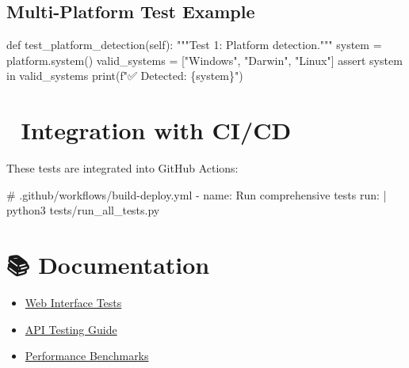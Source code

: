 \documentclass[
  11pt,
  oneside,
  openany]{scrbook}
\newenvironment{Shaded}{\begin{snugshade}}{\end{snugshade}}
\newcommand{\AttributeTok}[1]{\textcolor[rgb]{0.40,0.45,0.13}{#1}}
\newcommand{\BuiltInTok}[1]{\textcolor[rgb]{0.00,0.23,0.31}{#1}}
\newcommand{\CharTok}[1]{\textcolor[rgb]{0.13,0.47,0.30}{#1}}
\newcommand{\CommentTok}[1]{\textcolor[rgb]{0.37,0.37,0.37}{#1}}
\newcommand{\ControlFlowTok}[1]{\textcolor[rgb]{0.00,0.23,0.31}{#1}}
\newcommand{\FunctionTok}[1]{\textcolor[rgb]{0.28,0.35,0.67}{#1}}
\newcommand{\KeywordTok}[1]{\textcolor[rgb]{0.00,0.23,0.31}{#1}}
\newcommand{\NormalTok}[1]{\textcolor[rgb]{0.00,0.23,0.31}{#1}}
\newcommand{\OperatorTok}[1]{\textcolor[rgb]{0.37,0.37,0.37}{#1}}
\newcommand{\SpecialCharTok}[1]{\textcolor[rgb]{0.37,0.37,0.37}{#1}}
\newcommand{\SpecialStringTok}[1]{\textcolor[rgb]{0.13,0.47,0.30}{#1}}
\newcommand{\StringTok}[1]{\textcolor[rgb]{0.13,0.47,0.30}{#1}}
\newcommand{\VariableTok}[1]{\textcolor[rgb]{0.07,0.07,0.07}{#1}}
\providecommand{\tightlist}{%
  \setlength{\itemsep}{0pt}\setlength{\parskip}{0pt}}\usepackage{longtable,booktabs,array}
\begin{document}
\subsection{Multi-Platform Test
Example}\label{multi-platform-test-example}

\begin{Shaded}
\begin{Highlighting}[]
\KeywordTok{def}\NormalTok{ test\_platform\_detection(}\VariableTok{self}\NormalTok{):}
    \CommentTok{"""Test 1: Platform detection."""}
\NormalTok{    system }\OperatorTok{=}\NormalTok{ platform.system()}
\NormalTok{    valid\_systems }\OperatorTok{=}\NormalTok{ [}\StringTok{"Windows"}\NormalTok{, }\StringTok{"Darwin"}\NormalTok{, }\StringTok{"Linux"}\NormalTok{]}
    \ControlFlowTok{assert}\NormalTok{ system }\KeywordTok{in}\NormalTok{ valid\_systems}
    \BuiltInTok{print}\NormalTok{(}\SpecialStringTok{f"✅ Detected: }\SpecialCharTok{\{}\NormalTok{system}\SpecialCharTok{\}}\SpecialStringTok{"}\NormalTok{)}
\end{Highlighting}
\end{Shaded}

\section{🔄 Integration with CI/CD}\label{integration-with-cicd}

These tests are integrated into GitHub Actions:

\begin{Shaded}
\begin{Highlighting}[]
\CommentTok{\# .github/workflows/build{-}deploy.yml}
\KeywordTok{{-}}\AttributeTok{ }\FunctionTok{name}\KeywordTok{:}\AttributeTok{ Run comprehensive tests}
\FunctionTok{  run}\KeywordTok{: }\CharTok{|}
\NormalTok{    python3 tests/run\_all\_tests.py}
\end{Highlighting}
\end{Shaded}

\section{📚 Documentation}\label{documentation}

\begin{itemize}
\tightlist
\item
  \href{../docs/development/TESTING.md}{Web Interface Tests}
\item
  \href{../docs/api/TESTING.md}{API Testing Guide}
\item
  \href{../docs/development/PERFORMANCE.md}{Performance Benchmarks}
\end{itemize}
\end{document}
